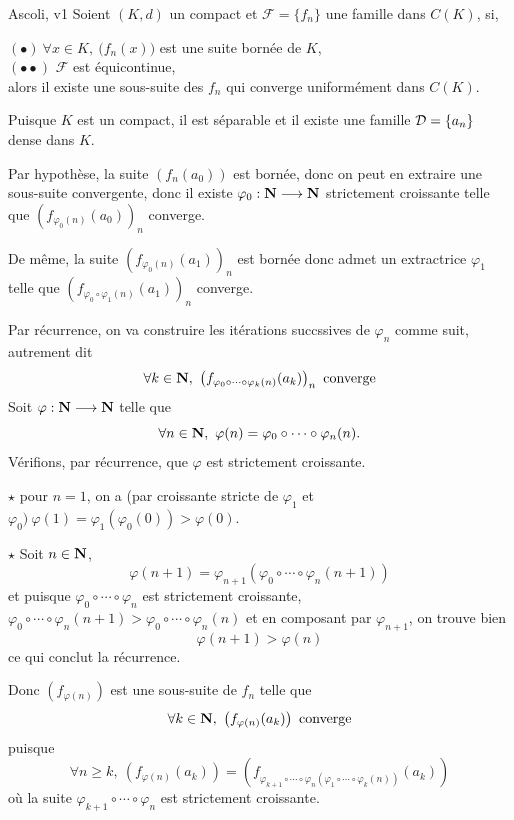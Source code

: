 \documentclass[a4paper,11pt, twoside]{article}
\begin{document}
\begin{thC}{Ascoli, v1}
  Soient $(K,d)$ un compact et $\mathcal F=\{f_n\}$ une famille dans $C(K)$, si,

  $(\bullet)\ \forall x\in K,\ \big(f_n(x)\big)$ est une suite bornée de $K$,\\
  $(\bullet\bullet)$ $\mathcal F$ est équicontinue,\\

  alors il existe une sous-suite des $f_n$ qui converge uniformément dans $C(K).$
\end{thC}


\begin{Proof}
  Puisque $K$ est un compact, il est séparable et il existe une famille $\mathcal D=\{a_n\}$ dense dans $K$. 
  
  Par hypothèse, la suite $\left(f_n(a_0)\right)$ est bornée, donc on peut en extraire une sous-suite convergente, donc il existe $\varphi_0:\mathbf N\longrightarrow\mathbf N$ strictement croissante telle que $\left(f_{\varphi_0(n)}(a_0)\right)_n$ converge.

  De même, la suite $\left(f_{\varphi_0(n)}(a_1)\right)_n$ est bornée donc admet un extractrice $\varphi_1$ telle que $\left(f_{\varphi_0\circ\varphi_1(n)}(a_1)\right)_n$ converge.

  Par récurrence, on va construire les itérations succssives de $\varphi_n$ comme suit, autrement dit 
  $$\forall k\in\N,\ \left(f_{\varphi_0\circ\cdots\circ\varphi_k(n)}(a_k)\right)_n\text{ converge}$$
  Soit $\varphi:\mathbf N\longrightarrow\mathbf N$ telle que 
  $$\forall n\in\N,\ \varphi(n)=\varphi_0\circ\cdots\circ\varphi_n(n).$$
  Vérifions, par récurrence, que $\varphi$ est strictement croissante. 
    
  $\star$ pour $n=1$, on a (par croissante stricte de $\varphi_1$ et $\varphi_0)\ \varphi(1)=\varphi_1(\varphi_0(0))>\varphi(0).$

  $\star$ Soit $n\in\mathbf N$,
  $$\varphi(n+1)=\varphi_{n+1}(\varphi_0\circ\cdots\circ\varphi_n(n+1))$$
  et puisque $\varphi_0\circ\cdots\circ\varphi_n$ est strictement croissante, $\varphi_0\circ\cdots\circ\varphi_n(n+1)>\varphi_0\circ\cdots\circ\varphi_n(n)$ et en composant par $\varphi_{n+1}$, on trouve bien
  $$\varphi(n+1)>\varphi(n)$$
  ce qui conclut la récurrence.

  Donc $\left(f_{\varphi(n)}\right)$ est une sous-suite de $f_n$ telle que 
  $$\forall k\in\N,\ \left(f_{\varphi(n)}(a_k)\right)\text{ converge}$$
  puisque 
  $$\forall n\geqslant k,\ \left(f_{\varphi(n)}(a_k)\right)=\left(f_{\varphi_{k+1}\circ\cdots\circ\varphi_n(\varphi_1\circ\cdots\circ\varphi_k(n))}(a_k)\right)$$
  où la suite $\varphi_{k+1}\circ\cdots\circ\varphi_n$ est strictement croissante.


\end{Proof}
\end{document}
